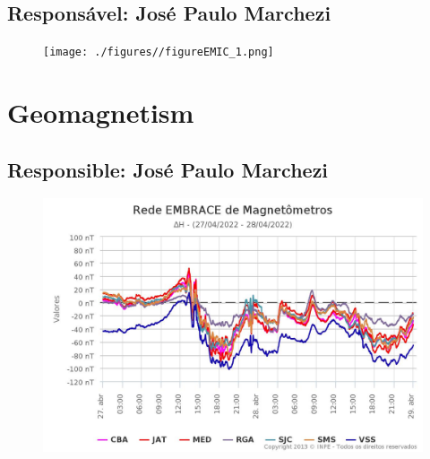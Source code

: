 \documentclass[11pt, oneside]{article}
\begin{document}
 \subsection{Responsável: José Paulo Marchezi} 
 
\begin{figure}[H]
    
                        \centering
   
                             \texttt{[image: ./figures//figureEMIC\_1.png]}

                        \end{figure}

                     \section{Geomagnetism} 
 \subsection{Responsible: José Paulo Marchezi} 
 
\begin{figure}[H]
    
                        \centering
   
                             \includegraphics[width=14cm]{./figures//figureGeomag_0.png}

                        \end{figure}
\end{document}

